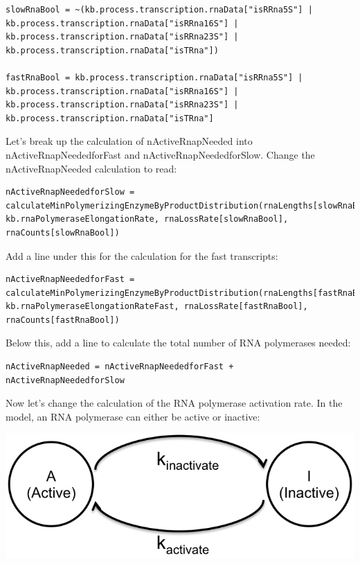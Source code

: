 \documentclass[12pt]{article}
\begin{document}
\lstset{language=Python}
\begin{lstlisting}
slowRnaBool = ~(kb.process.transcription.rnaData["isRRna5S"] | kb.process.transcription.rnaData["isRRna16S"] | kb.process.transcription.rnaData["isRRna23S"] | kb.process.transcription.rnaData["isTRna"])

fastRnaBool = kb.process.transcription.rnaData["isRRna5S"] | kb.process.transcription.rnaData["isRRna16S"] | kb.process.transcription.rnaData["isRRna23S"] | kb.process.transcription.rnaData["isTRna"]
\end{lstlisting}

Let’s break up the calculation of nActiveRnapNeeded into nActiveRnapNeededforFast and nActiveRnapNeededforSlow. Change the nActiveRnapNeeded calculation to read:

\begin{lstlisting}
nActiveRnapNeededforSlow = calculateMinPolymerizingEnzymeByProductDistribution(rnaLengths[slowRnaBool], kb.rnaPolymeraseElongationRate, rnaLossRate[slowRnaBool], rnaCounts[slowRnaBool])
\end{lstlisting}

Add a line under this for the calculation for the fast transcripts:

\begin{lstlisting}
nActiveRnapNeededforFast = calculateMinPolymerizingEnzymeByProductDistribution(rnaLengths[fastRnaBool], kb.rnaPolymeraseElongationRateFast, rnaLossRate[fastRnaBool], rnaCounts[fastRnaBool])
\end{lstlisting}

Below this, add a line to calculate the total number of RNA polymerases needed:

\begin{lstlisting}
nActiveRnapNeeded = nActiveRnapNeededforFast + nActiveRnapNeededforSlow
\end{lstlisting}

Now let’s change the calculation of the RNA polymerase activation rate. In the model, an RNA polymerase can either be active or inactive:

\includegraphics{img.png}
\end{document}
